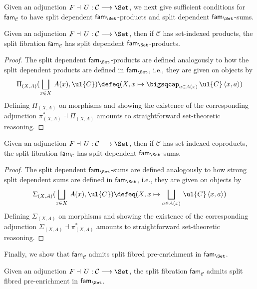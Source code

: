Given an adjunction $F \dashv\, U : \mathcal{C} \longrightarrow \Set$, we next give sufficient conditions   for $\mathsf{fam}_{\mathcal{C}}$ to have split dependent $\mathsf{fam}_{\Set}$-products and split dependent $\mathsf{fam}_{\Set}$-sums.

\begin{proposition}
Given an adjunction $F \dashv\, U : \mathcal{C} \longrightarrow \Set$, then if $\mathcal{C}$ has set-indexed products, the split fibration $\mathsf{fam}_{\mathcal{C}}$ has split dependent $\mathsf{fam}_{\Set}$-products.
\end{proposition}

\begin{proof}
The split dependent $\mathsf{fam}_{\Set}$-products are defined analogously to how the split dependent products are defined in $\mathsf{fam}_{\Set}$, i.e., they are given on objects by
\[
\Pi_{(X,A)}(\bigsqcup_{x \in X}\, A(x), \ul{C}) \defeq (X , x \mapsto \bigsqcap_{a \in A(x)}\, \ul{C}\, \langle x , a \rangle)
\]
Defining $\Pi_{(X,A)}$ on morphisms and showing the existence of the corresponding adjunction $\pi_{(X,A)}^* \dashv \Pi_{(X,A)}$ amounts to straightforward set-theoretic reasoning.
\end{proof}

\begin{proposition}
Given an adjunction $F \dashv\, U : \mathcal{C} \longrightarrow \Set$, then if $\mathcal{C}$ has set-indexed coproducts, the split fibration $\mathsf{fam}_{\mathcal{C}}$ has split dependent $\mathsf{fam}_{\Set}$-sums.
\end{proposition}

\begin{proof}
The split dependent $\mathsf{fam}_{\Set}$-sums are defined analogously to how strong split dependent sums are defined in $\mathsf{fam}_{\Set}$, i.e., they are given on objects by
\[
\Sigma_{(X,A)}(\bigsqcup_{x \in X}\, A(x), \ul{C}) \defeq (X , x \mapsto \bigsqcup_{a \in A(x)}\, \ul{C}\, \langle x , a \rangle)
\]
Defining $\Sigma_{(X,A)}$ on morphisms and showing the existence of the corresponding adjunction $\Sigma_{(X,A)} \dashv \pi_{(X,A)}^*$ amounts to straightforward set-theoretic reasoning.
\end{proof}

Finally, we show that $\mathsf{fam}_{\mathcal{C}}$ admits split fibred pre-enrichment in $\mathsf{fam}_{\Set}$.

\begin{proposition}
\label{prop:familiesofsetsshallwoenrichment}
Given an adjunction $F \dashv\, U : \mathcal{C} \longrightarrow \Set$, the split fibration $\mathsf{fam}_{\mathcal{C}}$ admits split fibred pre-enrichment in $\mathsf{fam}_{\Set}$.
\end{proposition}

